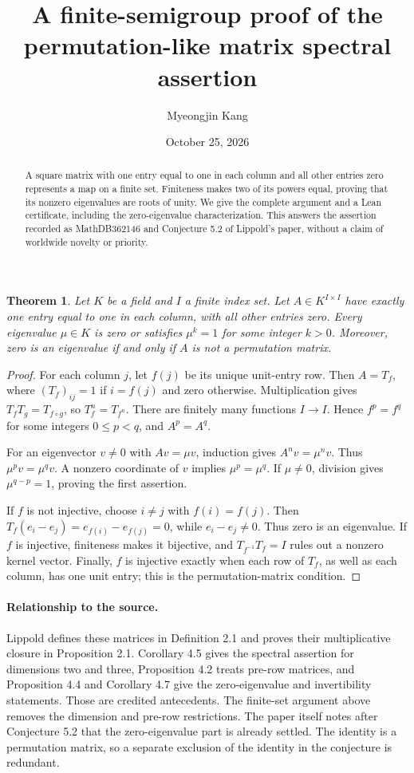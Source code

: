\documentclass[11pt]{article}
\title{A finite-semigroup proof of the permutation-like matrix spectral assertion}
\author{Myeongjin Kang}
\date{October 25, 2026}
\newtheorem{theorem}{Theorem}
\begin{document}
\maketitle
\begin{abstract}
A square matrix with one entry equal to one in each column and all other
entries zero represents a map on a finite set. Finiteness makes two of its
powers equal, proving that its nonzero eigenvalues are roots of unity.
We give the complete argument and a Lean certificate, including the
zero-eigenvalue characterization. This answers the assertion recorded as
MathDB362146 and Conjecture 5.2 of Lippold's paper, without a claim of
worldwide novelty or priority.
\end{abstract}
\begin{theorem}
Let $K$ be a field and $I$ a finite index set. Let $A\in K^{I\times I}$
have exactly one entry equal to one in each column, with all other entries
zero. Every eigenvalue $\mu\in K$ is zero or satisfies $\mu^k=1$ for some
integer $k>0$. Moreover, zero is an eigenvalue if and only if $A$ is not a
permutation matrix.
\end{theorem}
\begin{proof}
For each column $j$, let $f(j)$ be its unique unit-entry row. Then
$A=T_f$, where $(T_f)_{ij}=1$ if $i=f(j)$ and zero otherwise.
Multiplication gives $T_fT_g=T_{f\circ g}$, so $T_f^n=T_{f^n}$.
There are finitely many functions $I\to I$. Hence $f^p=f^q$ for some
integers $0\le p<q$, and $A^p=A^q$.

For an eigenvector $v\ne0$ with $Av=\mu v$, induction gives
$A^nv=\mu^nv$. Thus $\mu^pv=\mu^qv$. A nonzero coordinate of $v$
implies $\mu^p=\mu^q$. If $\mu\ne0$, division gives
$\mu^{q-p}=1$, proving the first assertion.

If $f$ is not injective, choose $i\ne j$ with $f(i)=f(j)$. Then
$T_f(e_i-e_j)=e_{f(i)}-e_{f(j)}=0$, while $e_i-e_j\ne0$.
Thus zero is an eigenvalue. If $f$ is injective, finiteness makes it
bijective, and $T_{f^{-1}}T_f=I$ rules out a nonzero kernel vector.
Finally, $f$ is injective exactly when each row of $T_f$, as well as each
column, has one unit entry; this is the permutation-matrix condition.
\end{proof}
\paragraph{Relationship to the source.}
Lippold \cite{lippold} defines these matrices in Definition 2.1 and proves
their multiplicative closure in Proposition 2.1. Corollary 4.5 gives the
spectral assertion for dimensions two and three, Proposition 4.2 treats
pre-row matrices, and Proposition 4.4 and Corollary 4.7 give the
zero-eigenvalue and invertibility statements. Those are credited antecedents.
The finite-set argument above removes the dimension and pre-row restrictions.
The paper itself notes after Conjecture 5.2 that the zero-eigenvalue part is
already settled. The identity is a permutation matrix, so a separate
exclusion of the identity in the conjecture is redundant.
\end{document}

